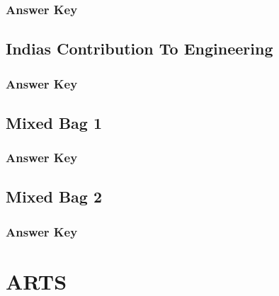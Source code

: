 \documentclass[12pt,a4paper]{book}
\newcounter{totalcounter}
\begin{document}


\subsection*{Answer Key}



\setcounter{totalcounter}{1}

\section{Indias Contribution To Engineering}



\subsection*{Answer Key}



\setcounter{totalcounter}{1}

\section{Mixed Bag 1}



\subsection*{Answer Key}



\setcounter{totalcounter}{1}

\section{Mixed Bag 2}



\subsection*{Answer Key}



\chapter{ARTS}
\end{document}
